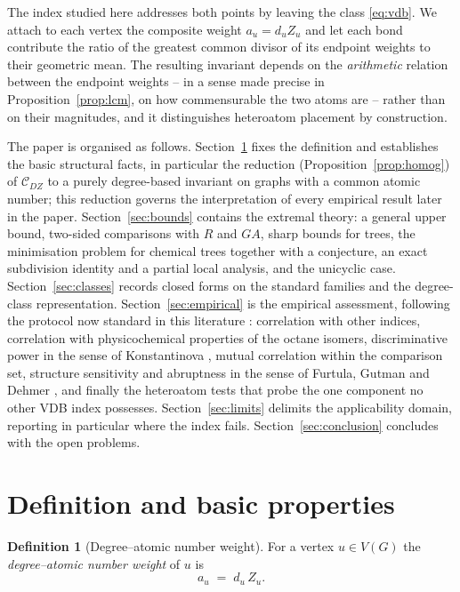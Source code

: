 \documentclass[11pt,a4paper]{article}
\theoremstyle{plain}
\theoremstyle{definition}
\newtheorem{definition}[theorem]{Definition}
\theoremstyle{remark}
\newcommand{\CDZ}{\mathcal{C}_{DZ}}
\begin{document}
The index studied here addresses both points by leaving the class \eqref{eq:vdb}.
We attach to each vertex the composite weight $a_u=d_uZ_u$ and let each bond
contribute the ratio of the greatest common divisor of its endpoint weights to
their geometric mean. The resulting invariant depends on the \emph{arithmetic}
relation between the endpoint weights -- in a sense made precise in
Proposition~\ref{prop:lcm}, on how commensurable the two atoms are -- rather than
on their magnitudes, and it distinguishes heteroatom placement by construction.

The paper is organised as follows. Section~\ref{sec:def} fixes the definition and
establishes the basic structural facts, in particular the reduction
(Proposition~\ref{prop:homog}) of $\CDZ$ to a purely degree-based invariant on
graphs with a common atomic number; this reduction governs the interpretation of
every empirical result later in the paper. Section~\ref{sec:bounds} contains the
extremal theory: a general upper bound, two-sided comparisons with $R$ and $GA$,
sharp bounds for trees, the minimisation problem for chemical trees together with
a conjecture, an exact subdivision identity and a partial local analysis, and the
unicyclic case.
Section~\ref{sec:classes} records closed forms on the standard families and the
degree-class representation. Section~\ref{sec:empirical} is the empirical
assessment, following the protocol now standard in this literature
\cite{oz2025,furtula2025ijmc,kumar2024}: correlation with other indices,
correlation with physicochemical properties of the octane isomers,
discriminative power in the sense of Konstantinova \cite{konstantinova1996},
mutual correlation within the comparison set, structure sensitivity and
abruptness in the sense of Furtula, Gutman and Dehmer \cite{furtula2013}, and
finally the heteroatom tests that probe the one component no other VDB index
possesses. Section~\ref{sec:limits} delimits the applicability domain, reporting
in particular where the index fails. Section~\ref{sec:conclusion} concludes with
the open problems.

\section{Definition and basic properties}
\label{sec:def}

\begin{definition}[Degree--atomic number weight]
\label{def:weight}
For a vertex $u\in V(G)$ the \emph{degree--atomic number weight} of $u$ is
\[
  a_u \;=\; d_u\,Z_u .
\]
\end{definition}
\end{document}
